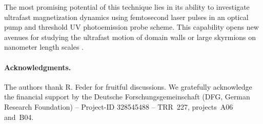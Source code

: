\documentclass[prl,twocolumn,floatfix,superscriptaddress,aps]{revtex4-2}
\begin{document}
The most promising potential of this technique lies in its ability to investigate ultrafast magnetization dynamics using femtosecond laser pulses in an optical pump and threshold UV photoemission probe scheme. This capability opens new avenues for studying the ultrafast motion of domain walls \cite{parkin2008} or large skyrmions on nanometer length scales \cite{goebel2019,jani2021,kern2022}.

\paragraph{Acknowledgments.} 
The authors thank R. Feder for fruitful discussions. We gratefully acknowledge the financial support by the Deutsche Forschungsgemeinschaft (DFG, German Research Foundation) -- Project-ID 328545488 -- TRR~227, projects~A06 and~B04.
\end{document}
